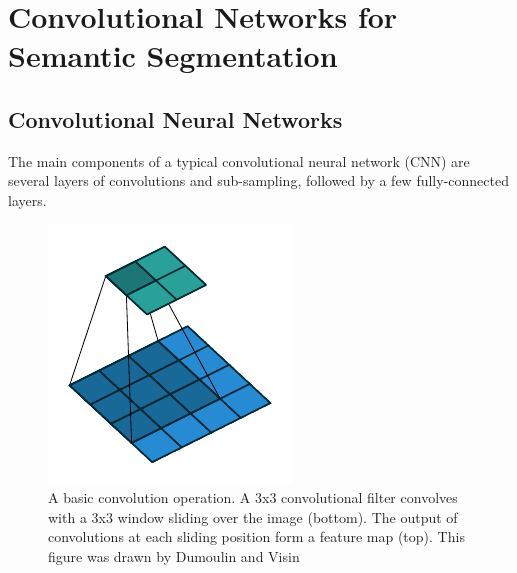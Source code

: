 


\section{Convolutional Networks for Semantic Segmentation}
\label{sec:cnn4seg}

\subsection{Convolutional Neural Networks}
\label{subsec:cnn}


The main components of a typical convolutional neural network (CNN) are several layers of convolutions and sub-sampling, followed by a few fully-connected layers.


\begin{figure}[t]
\centering
   \includegraphics[width=\linewidth]{img/no_padding_no_strides_00.pdf}
\caption{
A basic convolution operation.
A 3x3 convolutional filter convolves with a 3x3 window sliding over the image (bottom).
The output of convolutions at each sliding position form a feature map (top).
This figure was drawn by Dumoulin and Visin \cite{dumoulin2016guide}
}
\label{fig:conv}
\end{figure}


